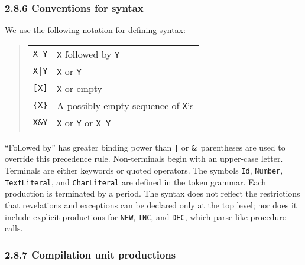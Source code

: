 \documentclass[10pt]{article}
\begin{document}
\subsubsection*{2.8.6 Conventions for syntax}

We use the following notation for defining syntax:
\begin{quote}
  \begin{tabular}{cl}
    \verb|X Y| & \verb|X| followed by \verb|Y| \\
    \verb+X|Y+ & \verb|X| or \verb|Y| \\
    \verb|[X]| & \verb|X| or empty \\
    \verb|{X}| & A possibly empty sequence of \verb|X|'s \\
    \verb|X&Y| & \verb|X| or \verb|Y| or \verb|X Y| \\
  \end{tabular}
\end{quote}
``Followed by'' has greater binding power than \verb+|+ or \verb|&|;
parentheses are used to override this precedence rule.  Non-terminals begin
with an upper-case letter.  Terminals are either keywords or quoted operators.
The symbols \verb|Id|, \verb|Number|, \verb|TextLiteral|, and
\verb|CharLiteral| are defined in the token grammar.  Each production is
terminated by a period.  The syntax does not reflect the restrictions that
revelations and exceptions can be declared only at the top level; nor does it
include explicit productions for \verb|NEW|, \verb|INC|, and \verb|DEC|, which
parse like procedure calls.

\subsubsection*{2.8.7 Compilation unit productions}
\end{document}

